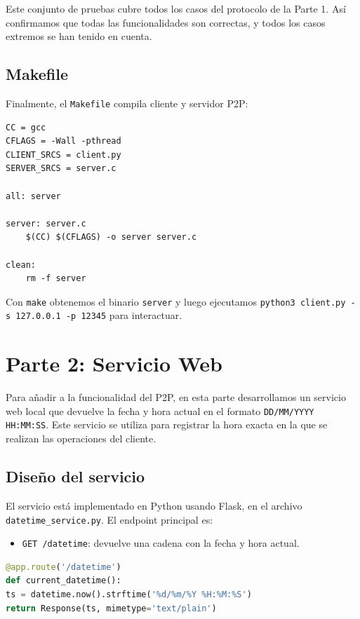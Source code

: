 \documentclass[12pt,a4paper]{article}
\begin{document}
Este conjunto de pruebas cubre todos los casos del protocolo de la Parte 1. Así confirmamos que todas las funcionalidades son correctas, y todos los casos extremos se han tenido en cuenta.

\subsection{Makefile}

Finalmente, el \texttt{Makefile} compila cliente y servidor P2P:

\begin{lstlisting}[caption={Makefile parte 1},label=lst:make1]
CC = gcc
CFLAGS = -Wall -pthread
CLIENT_SRCS = client.py
SERVER_SRCS = server.c

all: server

server: server.c
	$(CC) $(CFLAGS) -o server server.c

clean:
	rm -f server
\end{lstlisting}

Con \texttt{make} obtenemos el binario \texttt{server} y luego ejecutamos \texttt{python3 client.py -s 127.0.0.1 -p 12345} para interactuar.

\section{Parte 2: Servicio Web}

Para añadir a la funcionalidad del P2P, en esta parte desarrollamos un servicio web local que devuelve la fecha y hora actual en el formato \texttt{DD/MM/YYYY HH:MM:SS}. Este servicio se utiliza para registrar la hora exacta en la que se realizan las operaciones del cliente.

\subsection{Diseño del servicio}

El servicio está implementado en Python usando Flask, en el archivo \texttt{datetime\_service.py}. El endpoint principal es:

\begin{itemize}
\item \texttt{GET /datetime}: devuelve una cadena con la fecha y hora actual.
\end{itemize}

\begin{lstlisting}[language=Python,caption={Fragmento de datetime\_service.py},label=lst:web1]
@app.route('/datetime')
def current_datetime():
ts = datetime.now().strftime('%d/%m/%Y %H:%M:%S')
return Response(ts, mimetype='text/plain')
\end{lstlisting}
\end{document}
